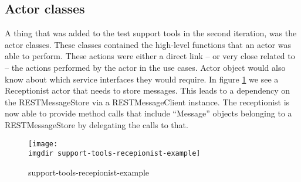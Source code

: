 \subsection{Actor classes}
A thing that was added to the test support tools in the second iteration, was the actor classes. These classes contained the high-level functions that an actor was able to perform. These actions were either a direct link -- or very close related to -- the actions performed by the actor in the use cases. Actor object would also know about which service interfaces they would require. In figure \ref{fig:support-tools-recepionist-example} we see a Receptionist actor that needs to store messages. This leads to a dependency on the RESTMessageStore via a RESTMessageClient instance. The receptionist is now able to provide method calls that include ``Message'' objects belonging to a RESTMessageStore by delegating the calls to that.
\begin{figure}
 \centering
 \texttt{[image: \\imgdir support-tools-recepionist-example]}
 \caption{support-tools-recepionist-example}
 \label{fig:support-tools-recepionist-example}
\end{figure}



